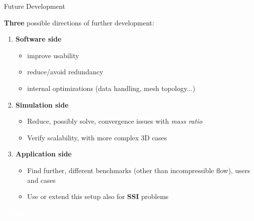 \documentclass[10pt,t]{beamer}
\makeatletter
\def\beamer@writeslidentry@miniframesoff{%
  \expandafter\beamer@ifempty\expandafter{\beamer@framestartpage}{}%
  {%
    \clearpage\beamer@notesactions%
  }
}
\newcommand*{\miniframesoff}{\let\beamer@writeslidentry=\beamer@writeslidentry@miniframesoff}
\makeatother
\begin{document}
\begin{frame}{Future Development}

\textbf{Three} possible directions of further development:

\vspace{0.3cm}


\begin{enumerate}
    \item \textcolor{pblue}{\textbf{Software side}}
        \itemsep 10pt
        \begin{itemize}
            \item improve usability
            \item reduce/avoid redundancy
            \item internal optimizations (data handling, mesh topology...)
        \end{itemize}    

    
    \item \textcolor{pblue}{\textbf{Simulation side}}
    
        \begin{itemize}
            \item Reduce, possibly solve, convergence issues with \textit{mass ratio}
            \item Verify scalability, with more complex 3D cases
        \end{itemize}

    
    \item \textcolor{pblue}{\textbf{Application side}}
    
        \begin{itemize}
            \item Find further, different benchmarks (other than incompressible flow), users and cases
            \item Use or extend this setup also for \textbf{SSI} problems 
        \end{itemize}
    
\end{enumerate}


\end{frame}


\begin{frame}[c,plain]{}
    \centering
    \large{\textcolor{white}{\textbf{Thank you}}}
\end{frame}


\miniframesoff
{}













\end{document}
